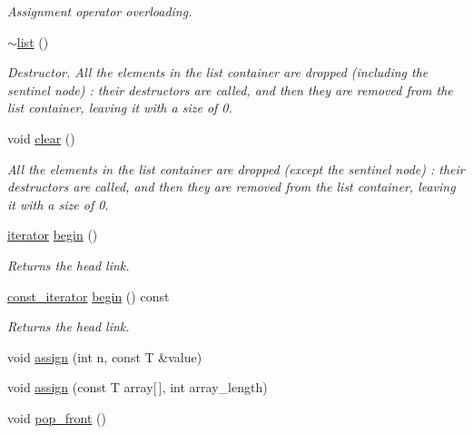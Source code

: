 \begin{DoxyCompactItemize}
\begin{DoxyCompactList}\small\item\em Assignment operator overloading. \end{DoxyCompactList}\item 
\hypertarget{classofeli_1_1list_a68fef2e0c33ffa015c2d4e9e8f11356a}{\hyperlink{classofeli_1_1list_a68fef2e0c33ffa015c2d4e9e8f11356a}{$\sim$list} ()}\label{classofeli_1_1list_a68fef2e0c33ffa015c2d4e9e8f11356a}

\begin{DoxyCompactList}\small\item\em Destructor. All the elements in the list container are dropped (including the sentinel node) \-: their destructors are called, and then they are removed from the list container, leaving it with a size of 0. \end{DoxyCompactList}\item 
\hypertarget{classofeli_1_1list_a1b4ab444619f6d412a461752ba019514}{void \hyperlink{classofeli_1_1list_a1b4ab444619f6d412a461752ba019514}{clear} ()}\label{classofeli_1_1list_a1b4ab444619f6d412a461752ba019514}

\begin{DoxyCompactList}\small\item\em All the elements in the list container are dropped (except the sentinel node) \-: their destructors are called, and then they are removed from the list container, leaving it with a size of 0. \end{DoxyCompactList}\item 
\hypertarget{classofeli_1_1list_a4f7f0567a64758636e3835ecea28a36f}{\hyperlink{classofeli_1_1list_1_1iterator}{iterator} \hyperlink{classofeli_1_1list_a4f7f0567a64758636e3835ecea28a36f}{begin} ()}\label{classofeli_1_1list_a4f7f0567a64758636e3835ecea28a36f}

\begin{DoxyCompactList}\small\item\em Returns the head link. \end{DoxyCompactList}\item 
\hypertarget{classofeli_1_1list_a2abcaf1bc66a9c292018efa55d6250ff}{\hyperlink{classofeli_1_1list_1_1const__iterator}{const\-\_\-iterator} \hyperlink{classofeli_1_1list_a2abcaf1bc66a9c292018efa55d6250ff}{begin} () const }\label{classofeli_1_1list_a2abcaf1bc66a9c292018efa55d6250ff}

\begin{DoxyCompactList}\small\item\em Returns the head link. \end{DoxyCompactList}\item 
void \hyperlink{classofeli_1_1list_a8c619ab7fedd643db5f3894889d91c74}{assign} (int n, const T \&value)
\item 
void \hyperlink{classofeli_1_1list_a7fbe8cc25a5c413924db708e47161306}{assign} (const T array\mbox{[}$\,$\mbox{]}, int array\-\_\-length)
\item 
\hypertarget{classofeli_1_1list_a38beb590b14408cbe2e0e5d573fbf5e2}{void \hyperlink{classofeli_1_1list_a38beb590b14408cbe2e0e5d573fbf5e2}{pop\-\_\-front} ()}\label{classofeli_1_1list_a38beb590b14408cbe2e0e5d573fbf5e2}


\end{DoxyCompactItemize}
